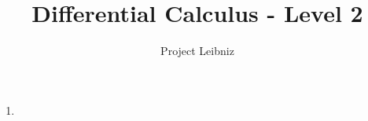 \documentclass{book}
\title{Differential Calculus - Level 2}
\author{Project Leibniz}
\begin{document}
\maketitle

\begin{enumerate}
    \item 
\end{enumerate}
\end{document}

